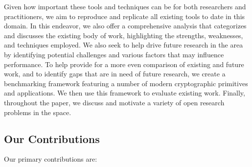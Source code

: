 Given how important these tools and techniques can be for both researchers and practitioners, we aim to reproduce and replicate all existing tools to date in this domain.  In this endeavor, we also offer a comprehensive analysis that categorizes and discusses the existing body of work, highlighting the strengths, weaknesses, and techniques employed.
We also seek to help drive future research in the area by identifying potential challenges and various factors that may influence performance.
To help provide for a more even comparison of existing and future work, and to identify gaps that are in need of future research, we create a benchmarking framework featuring a number of modern cryptographic primitives and applications. We then use this framework to evaluate existing work.
Finally, throughout the paper, we discuss and motivate a variety of open research problems in the space.

\subsection{Our Contributions}
Our primary contributions are:

